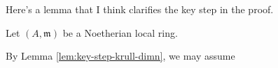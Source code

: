 \documentclass[reqno]{amsart} 
\begin{document}
Here's a lemma that I think clarifies the key step in the proof.
\begin{lemma}\label{lem:key-step-krull-dimn}
  Let $(A,\mathfrak{m})$ be a Noetherian local ring.
\end{lemma}
By Lemma \ref{lem:key-step-krull-dimn}, we may assume 


{} 
\end{document}
